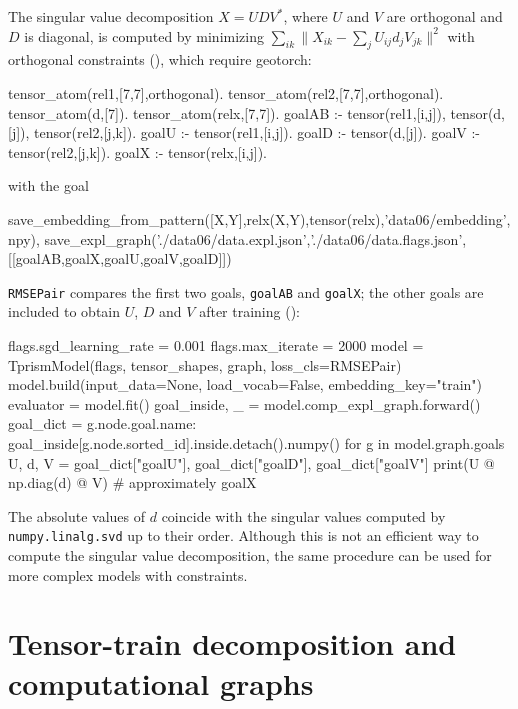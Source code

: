 \documentclass[a4paper]{report}
\begin{document}
The singular value decomposition $X=UDV^{*}$, where $U$ and $V$ are
orthogonal and $D$ is diagonal, is computed by minimizing
$\sum_{ik}\|X_{ik}-\sum_j U_{ij} d_{j} V_{jk}\|^2$ with orthogonal
constraints (), which require geotorch:
\begin{prologcode}
tensor_atom(rel1,[7,7],orthogonal).
tensor_atom(rel2,[7,7],orthogonal).
tensor_atom(d,[7]).
tensor_atom(relx,[7,7]).
goalAB :- tensor(rel1,[i,j]), tensor(d,[j]), tensor(rel2,[j,k]).
goalU :- tensor(rel1,[i,j]).
goalD :- tensor(d,[j]).
goalV :- tensor(rel2,[j,k]).
goalX :- tensor(relx,[i,j]).
\end{prologcode}
with the goal
\begin{prologcode}
save_embedding_from_pattern([X,Y],relx(X,Y),tensor(relx),'data06/embedding',npy),
save_expl_graph('./data06/data.expl.json','./data06/data.flags.json',
                [[goalAB,goalX,goalU,goalV,goalD]])
\end{prologcode}
{\tt RMSEPair} compares the first two goals, {\tt goalAB} and {\tt goalX};
the other goals are included to obtain $U$, $D$ and $V$ after training
():
\begin{pythoncode}
flags.sgd_learning_rate = 0.001
flags.max_iterate = 2000
model = TprismModel(flags, tensor_shapes, graph, loss_cls=RMSEPair)
model.build(input_data=None, load_vocab=False, embedding_key="train")
evaluator = model.fit()
goal_inside, _ = model.comp_expl_graph.forward()
goal_dict = {g.node.goal.name: goal_inside[g.node.sorted_id].inside.detach().numpy()
             for g in model.graph.goals}
U, d, V = goal_dict["goalU"], goal_dict["goalD"], goal_dict["goalV"]
print(U @ np.diag(d) @ V)      # approximately goalX
\end{pythoncode}
The absolute values of $d$ coincide with the singular values computed by
{\tt numpy.linalg.svd} up to their order.  Although this is not an
efficient way to compute the singular value decomposition, the same
procedure can be used for more complex models with constraints.

\section{Tensor-train decomposition and computational graphs}
\label{sec:tutorial_tt}
\end{document}
